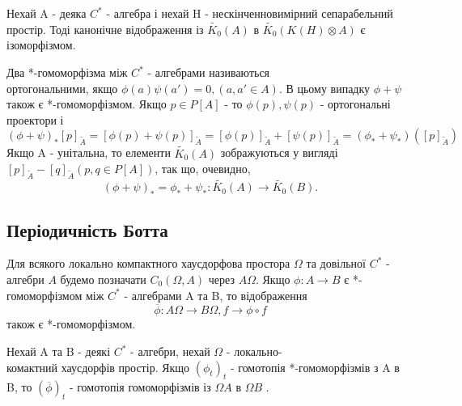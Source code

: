 \begin{theorem}
    Нехай A - деяка $C^*$ - алгебра і нехай H - нескінченновимірний сепарабельний простір.
    Тоді канонічне відображення із $\widetilde{K_0}(A)$ в $\widetilde{K_0}(K(H) \otimes A)$ є ізоморфізмом.
\end{theorem}

\begin{remark}
    Два *-гомоморфізма між $C^*$ - алгебрами називаються \\
    ортогональними, якщо $\phi(a)\psi(a') = 0, (a,a' \in A)$.
    В цьому випадку $\phi + \psi$ також є *-гомоморфізмом.
    Якщо $p \in P[A]$ - то $\phi(p), \psi(p)$ - ортогональні проектори і
    \begin{equation*}
        (\phi + \psi)_*[p]_{\widetilde{A}} =
        [\phi(p) + \psi(p)]_{\widetilde{A}} =
        [\phi(p)]_{\widetilde{A}} + [\psi(p)]_{\widetilde{A}} =
        (\phi_* + \psi_*)([p]_{\widetilde{A}})
    \end{equation*}
    Якщо A - унітальна, то елементи $ \widetilde{K_0}(A) $ зображуються у вигляді
    $[p]_{\widetilde{A}} - [q]_{\widetilde{A}} (p,q \in P[A])$, так що, очевидно,
    \begin{equation*}
        (\phi + \psi)_* = \phi_* + \psi_*: \widetilde{K_0}(A) \to \widetilde{K_0}(B).
    \end{equation*}
\end{remark}

\subsection{Періодичність Ботта}\label{subsec:періодичність-ботта}

Для всякого локально компактного хаусдорфова простора $\Omega$ та довільної $C^*$ - алгебри $A$
будемо позначати $C_0(\Omega, A)$ через $A\Omega$.
Якщо $\phi: A \to B$ є *-гомоморфізмом між $C^*$ - алгебрами A та B, то відображення
\begin{equation*}
    \overline{\phi}: A\Omega \to B\Omega, f \to \phi \circ f
\end{equation*}
також є *-гомоморфізмом.

\begin{theorem}
    \label{теорема:періодичність_1}
    Нехай A та B - деякі $C^*$ - алгебри, нехай $\Omega$ - локально-\\комактний хаусдорфів простір.
    Якщо $(\phi_t)_t$ - гомотопія *-гомоморфізмів з A в B, то $(\overline{\phi})_t$ - гомотопія гомоморфізмів із $\Omega A$ в $\Omega B$ .

\end{theorem}

